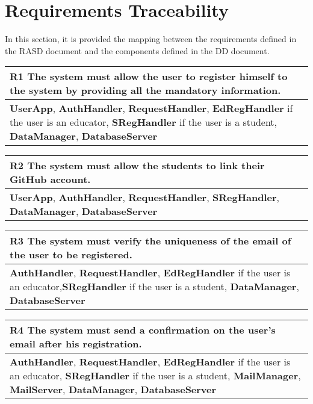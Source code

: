 \chapter{Requirements Traceability}
In this section, it is provided the mapping between the requirements defined in the RASD document and the components defined in the DD document.

\begin{table}[H]
    \begin{tabularx}{\textwidth}{X}
        \toprule
        \textbf{R1} The system must allow the user to register himself to the system by providing all the mandatory information. \\ \midrule
        \textbf{UserApp}, \textbf{AuthHandler}, \textbf{RequestHandler}, \textbf{EdRegHandler} if the user is an educator, \textbf{SRegHandler} if the user is a student,
        \textbf{DataManager}, \textbf{DatabaseServer} \\
    \end{tabularx}
\end{table}

\begin{table}[H]
    \begin{tabularx}{\textwidth}{X}
        \toprule
        \textbf{R2} The system must allow the students to link their GitHub account. \\ \midrule
        \textbf{UserApp}, \textbf{AuthHandler}, \textbf{RequestHandler}, \textbf{SRegHandler}, \textbf{DataManager}, \textbf{DatabaseServer} \\                  
    \end{tabularx}
\end{table}

\begin{table}[H]
    \begin{tabularx}{\textwidth}{X}
        \toprule
        \textbf{R3} The system must verify the uniqueness of the email of the user to be registered. \\ \midrule
        \textbf{AuthHandler}, \textbf{RequestHandler}, \textbf{EdRegHandler} if the user is an educator,\textbf{SRegHandler} if the user is a student, \textbf{DataManager},
        \textbf{DatabaseServer} \\                   
    \end{tabularx}
\end{table}

\begin{table}[H]
    \begin{tabularx}{\textwidth}{X}
        \toprule
        \textbf{R4} The system must send a confirmation on the user's email after his registration. \\ \midrule
        \textbf{AuthHandler}, \textbf{RequestHandler}, \textbf{EdRegHandler} if the user is an educator, \textbf{SRegHandler} if the user is a student,
        \textbf{MailManager}, \textbf{MailServer}, \textbf{DataManager}, \textbf{DatabaseServer} \\                    
    \end{tabularx}
\end{table}

